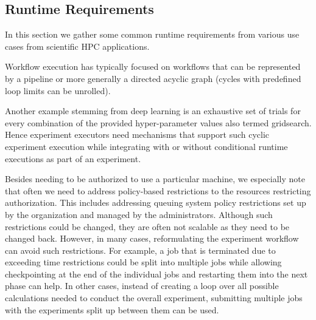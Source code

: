 \documentclass[sigconf]{acmart}
\begin{document}
\subsection{Runtime Requirements}
\label{sec:druntime}

In this section we gather some common runtime requirements from various use cases from scientific HPC applications.

 \label{subsubsection:cyclic}
Workflow execution has typically focused on workflows that can be represented by a pipeline or more generally a directed acyclic graph (cycles with predefined loop limits can be unrolled). 




Another example stemming from deep learning is an exhaustive set of trials for every combination of the provided hyper-parameter values also termed gridsearch. 
Hence experiment executors need mechanisms that support such cyclic experiment execution while integrating with or without conditional runtime executions as part of an experiment. 


Besides needing to be authorized to use a particular machine, we especially note that often we need to address policy-based restrictions to the resources restricting authorization. This includes addressing queuing system policy restrictions set up by the organization and managed by the administrators. Although such restrictions could be changed, they are often not scalable as they need to be changed back. However, in many cases, reformulating the experiment workflow can avoid such restrictions. For example, a job that is terminated due to exceeding time restrictions could be split into multiple jobs while allowing checkpointing at the end of the individual jobs and restarting them into the next phase can help. In other cases, instead of creating a loop over all possible calculations needed to conduct the overall experiment, submitting multiple jobs with the experiments split up between them can be used. 
\end{document}
